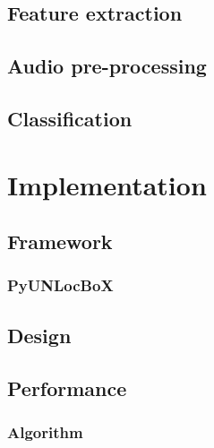 \documentclass[a4paper,12pt,twoside]{report}
\begin{document}
\section{Feature extraction}

\section{Audio pre-processing}

\section{Classification}

\chapter{Implementation}

\section{Framework}

\subsection{PyUNLocBoX}

\section{Design}

\section{Performance}

\subsection{Algorithm}
\end{document}
